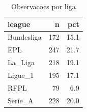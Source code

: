 \begin{table}

\caption{\label{tab:n_liga_g10}Observacoes por liga}
\centering
\begin{tabular}[t]{lrr}
\toprule
league & n & pct\\
\midrule
Bundesliga & 172 & 15.1\\
EPL & 247 & 21.7\\
La\_Liga & 218 & 19.1\\
Ligue\_1 & 195 & 17.1\\
RFPL & 79 & 6.9\\
\addlinespace
Serie\_A & 228 & 20.0\\
\bottomrule
\end{tabular}
\end{table}
